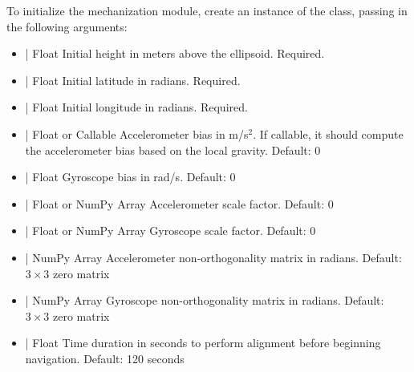 \documentclass[11pt, oneside]{article}   	%
\begin{document}
To initialize the mechanization module, create an instance of the  class, passing in the following arguments:
\begin{itemize}
	\item {} | Float \newline Initial height in meters above the ellipsoid. Required.
	\item {} | Float \newline Initial latitude in radians. Required.
	\item {} | Float \newline Initial longitude in radians. Required.
	\item {} | Float or Callable \newline Accelerometer bias in m/s$^2$. If callable, it should compute the accelerometer bias based on the local gravity. Default: 0
	\item {} | Float \newline Gyroscope bias in rad/s. Default: 0
	\item {} | Float or NumPy Array \newline Accelerometer scale factor. Default: 0
	\item {} | Float or NumPy Array \newline Gyroscope scale factor. Default: 0
	\item {} | NumPy Array \newline Accelerometer non-orthogonality matrix in radians. Default: $3\times3$ zero matrix
	\item {} | NumPy Array \newline Gyroscope non-orthogonality matrix in radians. Default: $3\times3$ zero matrix
	\item {} | Float \newline Time duration in seconds to perform alignment before beginning navigation. Default: 120 seconds
\end{itemize}
\end{document}
